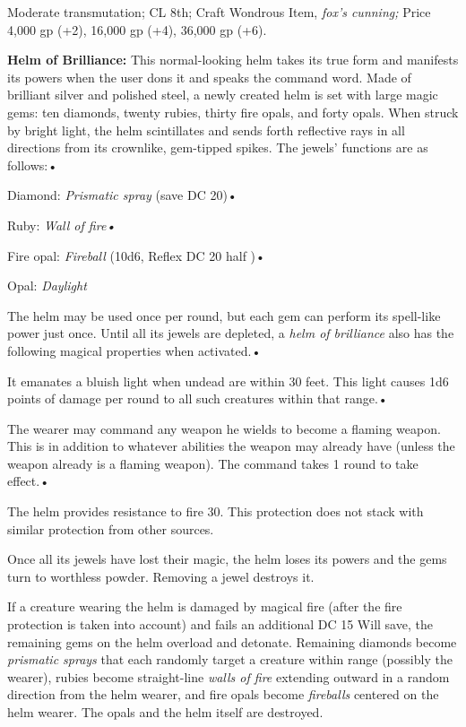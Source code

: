 \documentclass{article}
\begin{document}
Moderate transmutation; CL 8th; Craft Wondrous Item, \textit{fox's cunning; }Price 
4,000 gp (+2), 16,000 gp (+4), 36,000 gp (+6).

\textbf{Helm of Brilliance: }This normal-looking helm takes its true form and manifests 
its powers when the user dons it and speaks the command word. Made of brilliant 
silver and polished steel, a newly created helm is set with large magic gems: ten 
diamonds, twenty rubies, thirty fire opals, and forty opals. When struck by bright 
light, the helm scintillates and sends forth reflective rays in all directions 
from its crownlike, gem-tipped spikes. The jewels' functions are as follows:• 

\parindent=3pt
Diamond: \textit{Prismatic spray }(save DC 20)• 

Ruby: \textit{Wall of fire• }

Fire opal: \textit{Fireball }(10d6, Reflex DC 20 half )• 

Opal: \textit{Daylight}

\parindent=0pt
The helm may be used once per round, but each gem can perform its spell-like power 
just once. Until all its jewels are depleted, a \textit{helm of brilliance }also 
has the following magical properties when activated.• 

\parindent=3pt
It emanates a bluish light when undead are within 30 feet. This light causes 1d6 
points of damage per round to all such creatures within that range.• 

The wearer may command any weapon he wields to become a flaming weapon. This is 
in addition to whatever abilities the weapon may already have (unless the weapon 
already is a flaming weapon). The command takes 1 round to take effect.• 

\parindent=7pt
The helm provides resistance to fire 30. This protection does not stack with similar 
protection from other sources.

\parindent=0pt
Once all its jewels have lost their magic, the helm loses its powers and the gems 
turn to worthless powder. Removing a jewel destroys it.

If a creature wearing the helm is damaged by magical fire (after the fire protection 
is taken into account) and fails an additional DC 15 Will save, the remaining gems 
on the helm overload and detonate. Remaining diamonds become \textit{prismatic 
sprays }that each randomly target a creature within range (possibly the wearer), 
rubies become straight-line \textit{walls of fire }extending outward in a random 
direction from the helm wearer, and fire opals become \textit{fireballs }centered 
on the helm wearer. The opals and the helm itself are destroyed.
\end{document}

